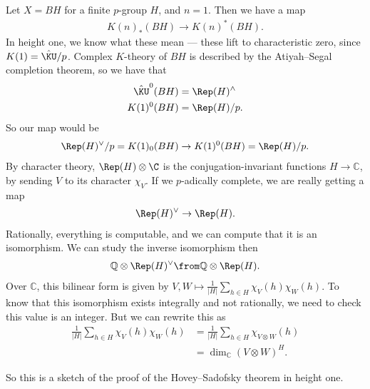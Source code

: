 \begin{example} Let $X = BH$ for a finite $p$-group $H$, and $n=1$. Then we have a map
\begin{align*}
    K(n)_\ast(BH) \to K(n)^\ast(BH).
\end{align*}
In height one, we know what these mean --- these lift to characteristic zero, since $K(1) = \hat{\KU}/p$. Complex $K$-theory of $BH$ is described by the Atiyah--Segal completion theorem, so we have that
\begin{align*}
    \hat{\KU}^0(BH) &= \Rep(H)^{\wedge} \\
    K(1)^0(BH) &= \Rep(H)/p.
\end{align*}
So our map would be
\begin{align*}
    \Rep(H)^\vee/p = K(1)_0(BH) \to K(1)^0(BH) = \Rep(H)/p.
\end{align*}
By character theory, $\Rep(H) \otimes \C$ is the conjugation-invariant functions $H \to \mathbb{C}$, by sending $V$ to its character $\chi_V$. If we $p$-adically complete, we are really getting a map
\begin{align*}
    \Rep(H)^\vee \to \Rep(H).
\end{align*}
Rationally, everything is computable, and we can compute that it is an isomorphism. We can study the inverse isomorphism then
\begin{align*}
    \mathbb{Q} \otimes \Rep(H)^\vee \from \mathbb{Q} \otimes \Rep(H).
\end{align*}
Over $\mathbb{C}$, this bilinear form is given by $V,W \mapsto \frac{1}{|H|} \sum_{h\in H} \chi_V(h) \chi_W(h)$. To know that this isomorphism exists integrally and not rationally, we need to check this value is an integer. But we can rewrite this as
\begin{align*}
    \frac{1}{|H|} \sum_{h\in H} \chi_V(h) \chi_W(h) &= \frac{1}{|H|} \sum_{h\in H} \chi_{V \otimes W}(h)  \\
    &= \dim_\mathbb{C} \left( V \otimes W \right)^H.
\end{align*}
\end{example}
So this is a sketch of the proof of the Hovey--Sadofsky theorem in height one.



